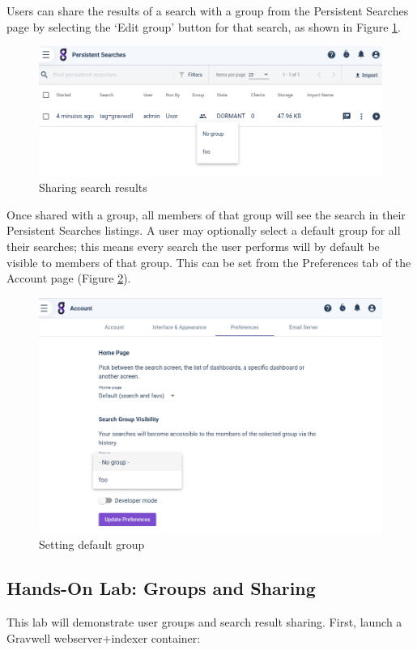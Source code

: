 {}

Users can share the results of a search with a group from the
Persistent Searches page by selecting the `Edit group' button for that
search, as shown in Figure \ref{fig:share-search}.

\begin{figure}
	\includegraphics[width=0.7\linewidth]{images/share-search.png}
	\caption{Sharing search results}
	\label{fig:share-search}
\end{figure}

Once shared with a group, all members of that group will see the search
in their Persistent Searches listings. A user may optionally select a
default group for all their searches; this means every search the user
performs will by default be visible to members of that group. This can
be set from the Preferences tab of the Account page (Figure \ref{fig:default-group}).

\begin{figure}
	\includegraphics[width=0.7\linewidth]{images/default-group.png}
	\caption{Setting default group}
	\label{fig:default-group}
\end{figure}

\clearpage
\subsection{Hands-On Lab: Groups and Sharing}

This lab will demonstrate user groups and search result sharing. First,
launch a Gravwell webserver+indexer container:

